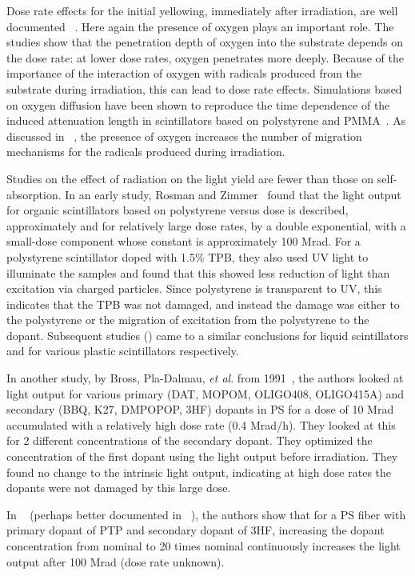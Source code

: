 \documentclass[review]{elsarticle}
\begin{document}
Dose rate effects for the initial yellowing, immediately after irradiation, are well documented  ~\cite{sauli,34504,Wick1991472,289295,173180,173178,Giokaris1993315}.
Here again the presence of oxygen plays an important role.  The studies show that the penetration depth of oxygen into the substrate
depends on the dose rate: at lower dose rates, oxygen penetrates
more deeply.  Because of the importance of the interaction
of oxygen with radicals produced from the substrate during irradiation, this can lead to dose rate effects.
Simulations based on oxygen diffusion have been shown
to reproduce the time dependence of the induced attenuation length in scintillators based on polystyrene and PMMA~\cite{Wick1991472}.  
As discussed 
in ~\cite{Wulkop1995141}, the presence of oxygen
increases the number of migration mechanisms for the radicals produced during irradiation.  


Studies on the effect of radiation on the light yield are fewer
than those on self-absorption.  
In an early study, Rosman and Zimmer~\cite{rosmanzimmer} found that the light
output for organic scintillators based on polystyrene versus dose is described,
approximately and for relatively large dose rates, by a double exponential, 
with a small-dose component whose constant is approximately 100 Mrad.
For a polystyrene scintillator doped with 1.5\% TPB, they also used UV light to illuminate
the samples  and found that this showed less
reduction of light than excitation via charged particles.
Since polystyrene is transparent to UV, this
indicates that the TPB was not damaged, and instead the damage
was either to the polystyrene or the migration of excitation from the polystyrene
to the dopant.  Subsequent studies (\cite{berlman,173178}) came to a similar conclusions for
liquid scintillators and for various plastic scintillators respectively. 


In another study, by Bross, Pla-Dalmau, {\it et al}. from 1991~\cite{Bross199135}, the authors looked at light output for various 
primary (DAT, MOPOM, OLIGO408, OLIGO415A) and 
secondary (BBQ, K27, DMPOPOP, 3HF) dopants 
in PS
for a dose of 10 Mrad accumulated with a relatively high  dose rate (0.4 Mrad/h).  They looked at this for 2 different concentrations of the secondary dopant.  They optimized the concentration of the first dopant using the light output before irradiation.  They found no change to the intrinsic light output, indicating at high dose rates the dopants were
not damaged by this large dose.  

In ~\cite{zorn3} (perhaps better documented in ~\cite{sauli}), the authors show that for a PS fiber with primary dopant of PTP and secondary dopant of 3HF,
increasing the dopant concentration from nominal to 20 times nominal continuously increases the light output after 100 Mrad (dose rate unknown).
\end{document}
